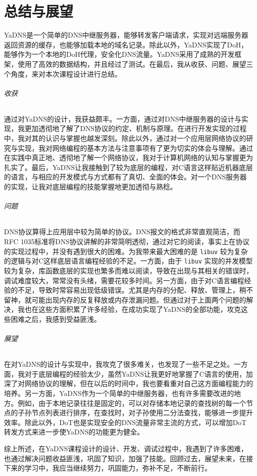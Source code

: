 \part{总结与展望}

YaDNS是一个简单的DNS中继服务器，能够转发客户端请求，实现对远端服务器返回资源的缓存，也能够加载本地的域名记录。除此以外，YaDNS实现了DoH，能够作为一个本地的DoH代理，安全化DNS流量。YaDNS采用了成熟的开发框架，使用了高效的数据结构，并且经过了测试。在最后，我从收获、问题、展望三个角度，来对本次课程设计进行总结。

\paragraph{收获} 通过对YaDNS的设计，我获益颇丰。一方面，通过对DNS中继服务器的设计与实现，我更加透彻地了解了DNS协议的约定、机制与原理。在进行开发实现的过程中，我对其的认识与掌握也越发深刻。除此以外，通过对一个应用层网络协议的研究与实现，我对网络编程的基本方法与注意事项有了更为切实的体会与理解。通过在实践中真正地、透彻地了解一个网络协议，我对于计算机网络的认知与掌握更为扎实了。最后，YaDNS让我接触到了较为底层的编程，对C语言这样贴近机器底层的语言，与相应的开发模式与方式都有了真切、全面的体会。对一个DNS服务器的实现，让我对底层编程的技能掌握地更加透彻与熟稔。

\paragraph{问题} DNS协议算得上应用层中较为简单的协议。DNS报文的格式非常直观简洁，而RFC 1035标准将DNS协议讲解的非常简明透彻，通过对它的阅读，事实上在协议的实现过程中，并没有遇到很大的困难。为我带来最大困难的是 \lstinline{libuv} 较为复杂的逻辑与对C这样底层语言编程经验的不足。一方面，由于 \lstinline{libuv} 实现的并发模型较为复杂，库函数底层的实现也繁多而难以阅读，导致在出现与其相关的错误时，调试难度较大，常常没有头绪，需要花较多时间。另一方面，由于对C语言编程经验的不足，导致时常容易出现低级错误。尤其是内存的分配、释放、管理上，稍不留神，就可能出现内存的反复释放或内存泄漏问题。但通过对于上面两个问题的解决，我也在这些方面积累了许多经验，在成功实现了YaDNS的全部功能，攻克这些困难之后，我感到受益匪浅。

\paragraph{展望} 在对YaDNS的设计与实现中，我攻克了很多难关，也发现了一些不足之处。一方面，我对于底层编程的经验太少，虽然YaDNS让我更好地掌握了C语言的使用，加深了对网络协议的理解，但在以后的时间中，我也要看重对自己这方面编程能力的培养。另一方面，YaDNS作为一个简单的中继服务器，也有许多需要改进的地方。例如，由于本地记录往往是固定的，可以对存储本地记录的查找树的每一个节点的子孙节点列表进行排序，在查找时，对子孙使用二分法查找，能够进一步提升效率。除此以外，DoT也是实现安全的DNS流量非常主流的方式，可以增加DoT转发方式来进一步使YaDNS的功能更为健全。

综上所述，在YaDNS课程设计的设计、开发、调试过程中，我遇到了许多困难，也通过解决问题收益匪浅，巩固了知识，加强了技能。回顾过去，展望未来，在接下来的学习中，我应当继续努力，巩固能力，弥补不足，不断前行。
